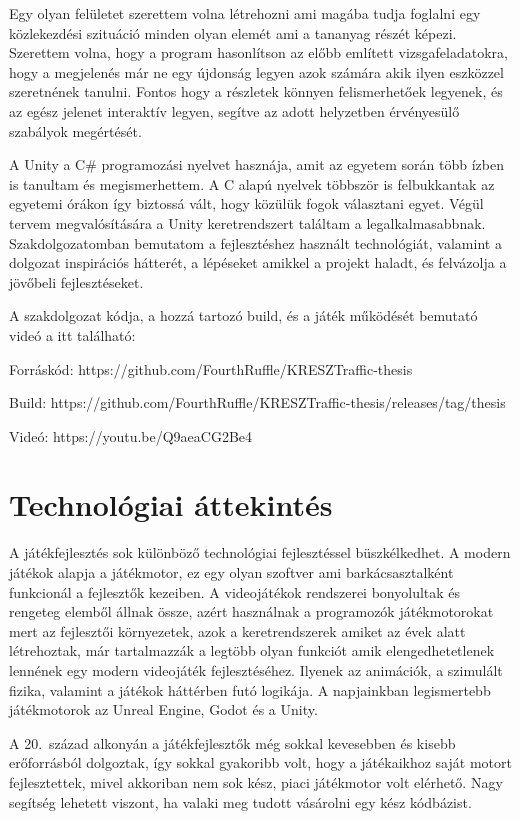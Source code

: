 \documentclass[
]{thesis-ekf}
\theoremstyle{definition}
\theoremstyle{remark}
\begin{document}
Egy olyan felületet szerettem volna létrehozni ami magába tudja foglalni egy közlekezdési szituáció minden olyan elemét ami a tananyag részét képezi. Szerettem volna, hogy a program hasonlítson az előbb említett vizsgafeladatokra, hogy a megjelenés már ne egy újdonság legyen azok számára akik ilyen eszközzel szeretnének tanulni. Fontos hogy a részletek könnyen felismerhetőek legyenek, és az egész jelenet interaktív legyen, segítve az adott helyzetben érvényesülő szabályok megértését.

A Unity a C\# programozási nyelvet hasznája, amit az egyetem során több ízben is tanultam és megismerhettem. A C alapú nyelvek többször is felbukkantak az egyetemi órákon így biztossá vált, hogy közülük fogok választani egyet. Végül tervem megvalósítására a Unity keretrendszert találtam a legalkalmasabbnak. Szakdolgozatomban bemutatom a fejlesztéshez használt technológiát, valamint a dolgozat inspirációs hátterét, a lépéseket amikkel a projekt haladt, és felvázolja a jövőbeli fejlesztéseket.

A szakdolgozat kódja, a hozzá tartozó build, és a játék működését bemutató videó a itt található:

Forráskód: https://github.com/FourthRuffle/KRESZTraffic-thesis

Build: https://github.com/FourthRuffle/KRESZTraffic-thesis/releases/tag/thesis

Videó: https://youtu.be/Q9aeaCG2Be4

\chapter{Technológiai áttekintés}
A játékfejlesztés sok különböző technológiai fejlesztéssel büszkélkedhet. A modern játékok alapja a játékmotor, ez egy olyan szoftver ami barkácsasztalként funkcionál a fejlesztők kezeiben. A videojátékok rendszerei bonyolultak és rengeteg elemből állnak össze, azért használnak a programozók játékmotorokat mert az fejlesztői környezetek, azok a keretrendszerek amiket az évek alatt létrehoztak, már tartalmazzák a legtöbb olyan funkciót amik elengedhetetlenek lennének egy modern videojáték fejlesztéséhez. Ilyenek az animációk, a szimulált fizika, valamint a játékok háttérben futó logikája. A napjainkban legismertebb játékmotorok az Unreal Engine, Godot és a Unity.

A 20.~század alkonyán a játékfejlesztők még sokkal kevesebben és kisebb erőforrásból dolgoztak, így sokkal gyakoribb volt, hogy a játékaikhoz saját motort fejlesztettek, mivel akkoriban nem sok kész, piaci játékmotor volt elérhető. Nagy segítség lehetett viszont, ha valaki meg tudott vásárolni egy kész kódbázist.
\end{document}
